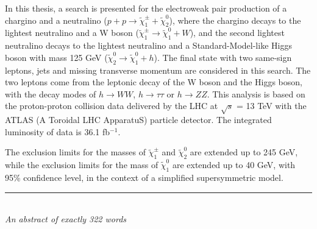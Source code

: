 In this thesis, a search is presented for the electroweak pair production of a chargino and a neutralino ($p + p \rightarrow \tilde{\chi}_1^\pm + \tilde{\chi}_2^0$),
where the chargino decays to the lightest neutralino and a W boson ($\tilde{\chi}_1^\pm \rightarrow \tilde{\chi}_1^0 + W$),
and the second lightest neutralino decays to the lightest neutralino and a Standard-Model-like Higgs boson with mass 125 GeV ($\tilde{\chi}_2^0 \rightarrow \tilde{\chi}_1^0 + h$).
The final state with two same-sign leptons, jets and missing transverse momentum are considered in this search.
The two leptons come from the leptonic decay of the W boson and the Higgs boson, with the decay modes of  $h \rightarrow WW$, $h \rightarrow \tau \tau$ or $h \rightarrow ZZ$.
This analysis is based on the proton-proton collision data delivered by the LHC at $\sqrt{s}$ = 13 TeV with the ATLAS (A Toroidal LHC ApparatuS) particle detector.
The integrated luminosity of data is 36.1 fb$^{-1}$.

The exclusion limits for the masses of $\tilde{\chi}_1^\pm$ and $\tilde{\chi}_2^0$ are extended up to 245 GeV, while the exclusion limits for the mass of $\tilde{\chi}_1^0$ are extended up to 40 GeV, with 95\% confidence level, in the context of a simplified supersymmetric model.

\bigskip

\begin{center}

\rule{6cm}{0.025cm}\\
{\slshape An abstract of exactly 322 words}

\end{center}
